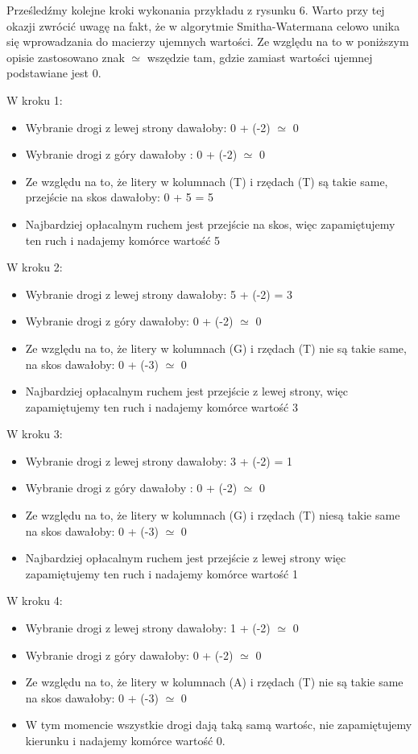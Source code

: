 \documentclass[a4paper,12pt]{article}
\newenvironment{lista}{
\begin{itemize}
  \setlength{\itemsep}{1pt}
  \setlength{\parskip}{0pt}
  \setlength{\parsep}{0pt}
}{\end{itemize}}
\begin{document}
Prześledźmy kolejne kroki wykonania przykładu z rysunku 6. Warto przy tej okazji zwrócić uwagę na fakt, że w algorytmie Smitha-Watermana celowo unika się wprowadzania do macierzy ujemnych wartości. Ze względu na to w poniższym opisie zastosowano znak $\simeq$ wszędzie tam, gdzie zamiast wartości ujemnej podstawiane jest 0.

W kroku 1:
\begin{lista}
\item Wybranie drogi z lewej strony dawałoby: 0 + (-2) $\simeq$ 0
\item Wybranie drogi z góry dawałoby : 0 + (-2) $\simeq$ 0
\item Ze względu na to, że litery w kolumnach (T) i rzędach (T) są takie same, przejście na skos dawałoby: 0 + 5 = 5
\item Najbardziej opłacalnym ruchem jest przejście na skos, więc zapamiętujemy ten ruch i nadajemy komórce wartość 5
\end{lista}

W kroku 2:
\begin{lista}
\item Wybranie drogi z lewej strony dawałoby: 5 + (-2) = 3
\item Wybranie drogi z góry dawałoby: 0 + (-2) $\simeq$ 0
\item Ze względu na to, że litery w kolumnach (G) i rzędach (T) nie są takie same, na skos dawałoby: 0 + (-3) $\simeq$ 0
\item Najbardziej opłacalnym ruchem jest przejście z lewej strony, więc zapamiętujemy ten ruch i nadajemy komórce wartość 3
\end{lista}

W kroku 3:
\begin{lista}
\item Wybranie drogi z lewej strony dawałoby: 3 + (-2) = 1
\item Wybranie drogi z góry dawałoby : 0 + (-2) $\simeq$ 0
\item Ze względu na to, że litery w kolumnach (G) i rzędach (T) niesą takie same na skos dawałoby: 0 + (-3) $\simeq$ 0
\item Najbardziej opłacalnym ruchem jest przejście z lewej strony więc zapamiętujemy ten ruch i nadajemy komórce wartość 1
\end{lista}

W kroku 4:
\begin{lista}
\item Wybranie drogi z lewej strony dawałoby: 1 + (-2) $\simeq$ 0
\item Wybranie drogi z góry dawałoby: 0 + (-2) $\simeq$ 0
\item Ze względu na to, że litery w kolumnach (A) i rzędach (T) nie są takie same na skos dawałoby: 0 + (-3) $\simeq$ 0
\item W tym momencie wszystkie drogi dają taką samą wartośc, nie zapamiętujemy kierunku i nadajemy komórce wartość 0.
\end{lista}
\end{document}
